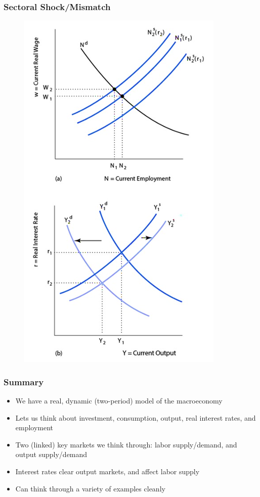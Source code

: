 \documentclass{beamer}
\begin{document}
\begin{frame} 
\frametitle[alignment=center]{Sectoral Shock/Mismatch} 
\begin{figure}
\centering
\includegraphics[scale=0.54]{Figures/W_Fig_11pt29.png}
\end{figure}
\end{frame}



\begin{frame} 
\frametitle[alignment=center]{Summary} 
\begin{itemize}
\item We have a real, dynamic (two-period) model of the macroeconomy
\bigskip
\item  Lets us think about investment, consumption, output, real interest rates, and employment
\bigskip
\item Two (linked) key markets we think through:  labor supply/demand, and output supply/demand
\bigskip
\item Interest rates clear output markets, and affect labor supply
\bigskip
\item Can think through a variety of examples cleanly
\end{itemize}
\end{frame}
\end{document}
